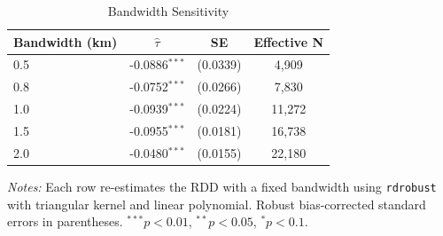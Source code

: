 \begin{table}[htbp]
\centering
\caption{Bandwidth Sensitivity}
\label{tab:bandwidth}
\begin{tabular}{lccc}
\toprule
Bandwidth (km) & $\hat{\tau}$ & SE & Effective N \\
\midrule
0.5 & -0.0886$^{***}$ & (0.0339) & 4,909 \\
0.8 & -0.0752$^{***}$ & (0.0266) & 7,830 \\
1.0 & -0.0939$^{***}$ & (0.0224) & 11,272 \\
1.5 & -0.0955$^{***}$ & (0.0181) & 16,738 \\
2.0 & -0.0480$^{***}$ & (0.0155) & 22,180 \\
\bottomrule
\end{tabular}
\begin{tablenotes}[flushleft]\small
\item \textit{Notes:} Each row re-estimates the RDD with a fixed bandwidth using \texttt{rdrobust} with triangular kernel and linear polynomial. Robust bias-corrected standard errors in parentheses. $^{***}p<0.01$, $^{**}p<0.05$, $^{*}p<0.1$.
\end{tablenotes}
\end{table}

